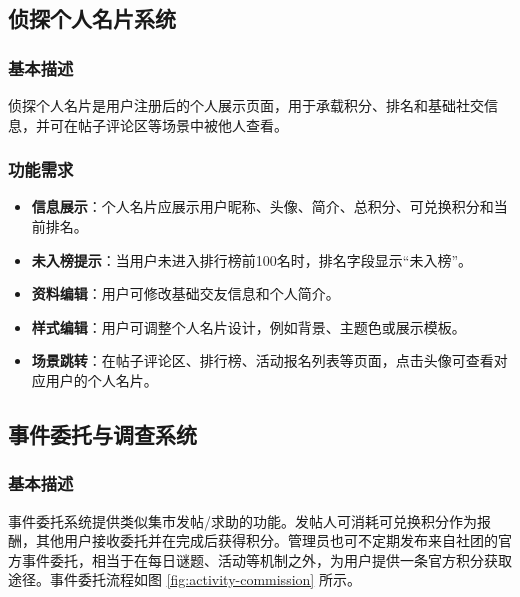 \documentclass[a4paper,12pt]{article}
\begin{document}
\subsection{侦探个人名片系统}

\subsubsection{基本描述}
侦探个人名片是用户注册后的个人展示页面，用于承载积分、排名和基础社交信息，并可在帖子评论区等场景中被他人查看。

\subsubsection{功能需求}
\begin{itemize}
    \item \textbf{信息展示}：个人名片应展示用户昵称、头像、简介、总积分、可兑换积分和当前排名。
    \item \textbf{未入榜提示}：当用户未进入排行榜前100名时，排名字段显示“未入榜”。
    \item \textbf{资料编辑}：用户可修改基础交友信息和个人简介。
    \item \textbf{样式编辑}：用户可调整个人名片设计，例如背景、主题色或展示模板。
    \item \textbf{场景跳转}：在帖子评论区、排行榜、活动报名列表等页面，点击头像可查看对应用户的个人名片。
\end{itemize}

\subsection{事件委托与调查系统}

\subsubsection{基本描述}
事件委托系统提供类似集市发帖/求助的功能。发帖人可消耗可兑换积分作为报酬，其他用户接收委托并在完成后获得积分。管理员也可不定期发布来自社团的官方事件委托，相当于在每日谜题、活动等机制之外，为用户提供一条官方积分获取途径。事件委托流程如图 \ref{fig:activity-commission} 所示。
\end{document}

